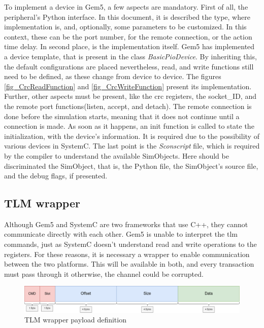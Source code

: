 To implement a device in Gem5, a few aspects are mandatory. First of all, the peripheral's Python interface. In this document, it is 
described the type, where implementation is, and, optionally, some parameters to be customized. In this context, these can be
the port number, for the remote connection, or the action time delay. In second place, is the implementation itself. Gem5 has implemented 
a device template, that is present in the class \textit{BasicPioDevice}. By inheriting this, the default configurations are placed 
nevertheless, read, and write functions still need to be defined, as these change from device to device. The figures \ref{fig_CrcReadFunction} and \ref{fig_CrcWriteFunction}
present its implementation. Further, other aspects must be present, like the \gls{crc} registers, the socket\_ID, and the remote 
port functions(listen, accept, and detach). The remote connection is done before the simulation starts, meaning that it does not
continue until a connection is made. As soon as it happens, an init function is called to state the initialization, with the 
device's information. It is required due to the possibility of various devices in SystemC. The last point is the \textit{Sconscript} file, 
which is required by the compiler to understand the available SimObjects. Here should be discriminated the SimObject, that is, 
the Python file, the SimObject's source file, and the debug flags, if presented.

\subsection{TLM wrapper}
\label{subsec::TLMwrapper}

Although Gem5 and SystemC are two frameworks that use C++, they cannot communicate directly with each other. Gem5 is unable to 
interpret the \gls{tlm} commands, just as SystemC doesn't understand read and write operations to the registers. For these reasons,
it is necessary a wrapper to enable communication between the two platforms. This will be available in both, and every transaction must
pass through it otherwise, the channel could be corrupted. 

\begin{figure}[H]
	\centering
 	\includegraphics[width=0.8\linewidth]{Images/TLM_Wrapper_Payload.png} 
 	\caption{TLM wrapper payload definition}
\end{figure}


